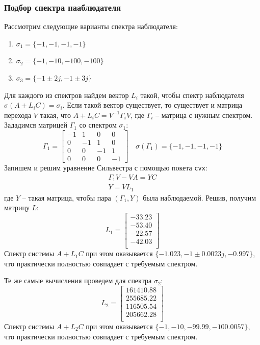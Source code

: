 \subsubsection{Подбор спектра нааблюдателя}
Рассмотрим следующие варианты спектра наблюдателя:
\begin{enumerate}
    \item  $\sigma_1 = \{-1, -1, -1, -1\}$
    \item $\sigma_2 = \{-1, -10, -100, -100\}$
    \item $\sigma_3 = \{-1\pm2j, -1\pm3j\}$
\end{enumerate}
Для каждого из спектров найдем вектор $L_i$ такой, чтобы спектр наблюдателя $\sigma(A + L_iC) = \sigma_i$. 
Если такой вектор существует, то существует и матрица перехода $V$ такая, что $A + L_iC = V^{-1}\Gamma_iV$, где 
$\Gamma_i$ -- матрица с нужным спектром. 
Зададимся матрицей $\Gamma_1$ со спектром $\sigma_1$: 
\begin{equation}
    \Gamma_1 = \begin{bmatrix}
        -1 & 1 & 0 & 0\\
        0 & -1 & 1 & 0\\
        0 & 0 & -1 & 1\\
        0 & 0 & 0 & -1
    \end{bmatrix}\quad \sigma(\Gamma_1) = \{-1, -1, -1, -1\}
\end{equation}
Запишем и решим уравнение Сильвестра с помощью покета \texttt{cvx}: 
\begin{equation}
    \begin{array}{ll}
        \Gamma_1 V - VA = YC\\
        Y = VL_1
    \end{array}
\end{equation}
где $Y$ -- такая матрица, чтобы пара $(\Gamma_1, Y)$ была наблюдаемой. Решив, получим матрицу $L$:
\begin{equation}
    L_1 = \begin{bmatrix}
        -33.23 \\ 
        -53.40 \\ 
        -22.57 \\ 
        -42.03 \\ 
    \end{bmatrix}
\end{equation}
Спектр системы $A + L_1C$ при этом оказывается $\{-1.023, -1\pm0.0023j, -0.997\}$, что практически 
полностью совпадает с требуемым спектром. 

Те же самые вычисления проведем для спектра $\sigma_2$:
\begin{equation}
    L_2 = \begin{bmatrix}
        161410.88 \\ 
        255685.22 \\ 
        116505.54 \\ 
        205662.28 \\ 
    \end{bmatrix}
\end{equation}
Спектр системы $A + L_2C$ при этом оказывается $\{-1, -10, -99.99, -100.0057\}$, что практически
полностью совпадает с требуемым спектром.

